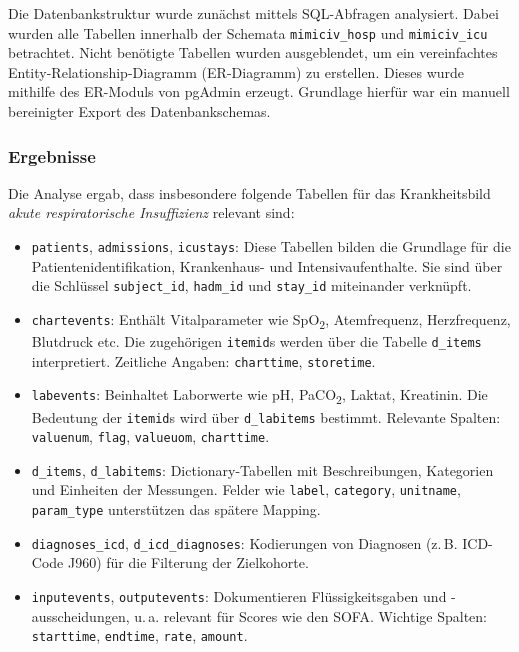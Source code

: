 \documentclass[12pt]{article}
\begin{document}
Die Datenbankstruktur wurde zunächst mittels SQL-Abfragen analysiert. Dabei wurden alle Tabellen innerhalb der Schemata \texttt{mimiciv\_hosp} und \texttt{mimiciv\_icu} betrachtet. Nicht benötigte Tabellen wurden ausgeblendet, um ein vereinfachtes Entity-Relationship-Diagramm (ER-Diagramm) zu erstellen. Dieses wurde mithilfe des ER-Moduls von pgAdmin erzeugt. Grundlage hierfür war ein manuell bereinigter Export des Datenbankschemas.

\subsubsection{Ergebnisse}
Die Analyse ergab, dass insbesondere folgende Tabellen für das Krankheitsbild \textit{akute respiratorische Insuffizienz} relevant sind:

\begin{itemize}
    \item \texttt{patients}, \texttt{admissions}, \texttt{icustays}: Diese Tabellen bilden die Grundlage für die Patientenidentifikation, Krankenhaus- und Intensivaufenthalte. Sie sind über die Schlüssel \texttt{subject\_id}, \texttt{hadm\_id} und \texttt{stay\_id} miteinander verknüpft.
    \item \texttt{chartevents}: Enthält Vitalparameter wie SpO\textsubscript{2}, Atemfrequenz, Herzfrequenz, Blutdruck etc. Die zugehörigen \texttt{itemid}s werden über die Tabelle \texttt{d\_items} interpretiert. Zeitliche Angaben: \texttt{charttime}, \texttt{storetime}.
    \item \texttt{labevents}: Beinhaltet Laborwerte wie pH, PaCO\textsubscript{2}, Laktat, Kreatinin. Die Bedeutung der \texttt{itemid}s wird über \texttt{d\_labitems} bestimmt. Relevante Spalten: \texttt{valuenum}, \texttt{flag}, \texttt{valueuom}, \texttt{charttime}.
    \item \texttt{d\_items}, \texttt{d\_labitems}: Dictionary-Tabellen mit Beschreibungen, Kategorien und Einheiten der Messungen. Felder wie \texttt{label}, \texttt{category}, \texttt{unitname}, \texttt{param\_type} unterstützen das spätere Mapping.
    \item \texttt{diagnoses\_icd}, \texttt{d\_icd\_diagnoses}: Kodierungen von Diagnosen (z.\,B. ICD-Code J960) für die Filterung der Zielkohorte.
    \item \texttt{inputevents}, \texttt{outputevents}: Dokumentieren Flüssigkeitsgaben und -ausscheidungen, u.\,a. relevant für Scores wie den SOFA. Wichtige Spalten: \texttt{starttime}, \texttt{endtime}, \texttt{rate}, \texttt{amount}.
\end{itemize}
\end{document}
